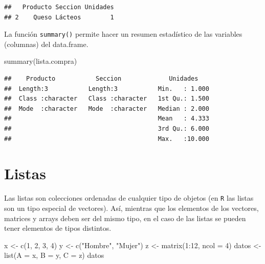 \documentclass[
]{book}
\newenvironment{Shaded}{\begin{snugshade}}{\end{snugshade}}
\newcommand{\AttributeTok}[1]{\textcolor[rgb]{0.77,0.63,0.00}{#1}}
\newcommand{\DecValTok}[1]{\textcolor[rgb]{0.00,0.00,0.81}{#1}}
\newcommand{\FunctionTok}[1]{\textcolor[rgb]{0.00,0.00,0.00}{#1}}
\newcommand{\NormalTok}[1]{#1}
\newcommand{\OtherTok}[1]{\textcolor[rgb]{0.56,0.35,0.01}{#1}}
\newcommand{\SpecialCharTok}[1]{\textcolor[rgb]{0.00,0.00,0.00}{#1}}
\newcommand{\StringTok}[1]{\textcolor[rgb]{0.31,0.60,0.02}{#1}}
\theoremstyle{break}
\theoremstyle{nonumberplain}
\begin{document}
\begin{verbatim}
##   Producto Seccion Unidades
## 2    Queso Lácteos        1
\end{verbatim}

La función \texttt{summary()} permite hacer un resumen estadístico de las
variables (columnas) del data.frame.

\begin{Shaded}
\begin{Highlighting}[]
\FunctionTok{summary}\NormalTok{(lista.compra)}
\end{Highlighting}
\end{Shaded}

\begin{verbatim}
##    Producto           Seccion             Unidades     
##  Length:3           Length:3           Min.   : 1.000  
##  Class :character   Class :character   1st Qu.: 1.500  
##  Mode  :character   Mode  :character   Median : 2.000  
##                                        Mean   : 4.333  
##                                        3rd Qu.: 6.000  
##                                        Max.   :10.000
\end{verbatim}

\hypertarget{listas}{%
\section{Listas}\label{listas}}

Las listas son colecciones ordenadas de cualquier tipo de objetos (en \texttt{R} las listas son un tipo especial de vectores).
Así, mientras que los elementos de los vectores, matrices y arrays deben ser del mismo tipo, en el caso de las listas se pueden tener elementos de tipos distintos.

\begin{Shaded}
\begin{Highlighting}[]
\NormalTok{x }\OtherTok{\textless{}{-}} \FunctionTok{c}\NormalTok{(}\DecValTok{1}\NormalTok{, }\DecValTok{2}\NormalTok{, }\DecValTok{3}\NormalTok{, }\DecValTok{4}\NormalTok{)}
\NormalTok{y }\OtherTok{\textless{}{-}} \FunctionTok{c}\NormalTok{(}\StringTok{"Hombre"}\NormalTok{, }\StringTok{"Mujer"}\NormalTok{)}
\NormalTok{z }\OtherTok{\textless{}{-}} \FunctionTok{matrix}\NormalTok{(}\DecValTok{1}\SpecialCharTok{:}\DecValTok{12}\NormalTok{, }\AttributeTok{ncol =} \DecValTok{4}\NormalTok{)}
\NormalTok{datos }\OtherTok{\textless{}{-}} \FunctionTok{list}\NormalTok{(}\AttributeTok{A =}\NormalTok{ x, }\AttributeTok{B =}\NormalTok{ y, }\AttributeTok{C =}\NormalTok{ z)}
\NormalTok{datos}
\end{Highlighting}
\end{Shaded}
\end{document}
